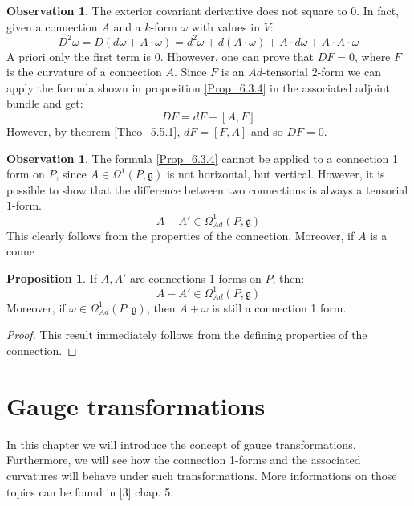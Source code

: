 \documentclass[12pt,a4paper]{report}
\theoremstyle{definition}
\theoremstyle{Theorem}
\newtheorem{Prop}[Def]{Proposition}
\theoremstyle{definition}
\theoremstyle{definition}
\newtheorem{Obs}[Def]{Observation}
\begin{document}
	\begin{Obs}\label{Obs_6.3.5}
		The exterior covariant derivative does not square to 0. In fact, given a connection $A$ and a $k$-form $\omega$ with values in $V$:
		$$D^2\omega=D(d\omega+A\cdot \omega)=d^2\omega+d(A\cdot \omega)+A\cdot d\omega+A\cdot A\cdot \omega$$
		A priori only the first term is 0. Hhowever, one can prove that $DF=0$, where $F$ is the curvature of a connection $A$. Since $F$ is an $Ad$-tensorial $2$-form we can apply the formula shown in proposition \ref{Prop_6.3.4} in the associated adjoint bundle and get:
		$$DF=dF+[A,F]$$
		However, by theorem \ref{Theo_5.5.1}, $dF=[F,A]$ and so $DF=0$.
	\end{Obs}
	\begin{Obs}
		The formula	\ref{Prop_6.3.4} cannot be applied to a connection 1 form on $P$, since $A\in\Omega^1(P,\mathfrak{g})$ is not horizontal, but vertical. However, it is possible to show that the difference between two connections is always a tensorial $1$-form. 
		$$A-A'\in\Omega^1_{Ad}(P,\mathfrak{g})$$
		This clearly follows from the properties of the connection. Moreover, if $A$ is a conne
	\end{Obs}
	\begin{Prop}\label{Prop_6.3.5}
		If $A,A'$ are connections 1 forms on $P$, then:
		$$A-A'\in\Omega^1_{Ad}(P,\mathfrak{g})$$
		Moreover, if $\omega\in\Omega^1_{Ad}(P,\mathfrak{g})$, then $A+\omega$ is still a connection 1 form.
	\end{Prop}
	\begin{proof}
		This result immediately follows from the defining properties of the connection.
	\end{proof}
	\chapter{Gauge transformations}
	In this chapter we will introduce the concept of gauge transformations. Furthermore, we will see how the connection 1-forms and the associated curvatures will behave under such transformations. More informations on those topics can be found in [3] chap. 5.
\end{document}
